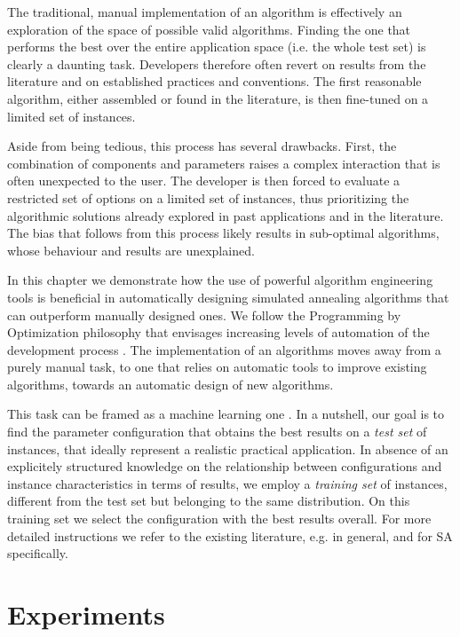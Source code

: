 The traditional, manual implementation of an algorithm is effectively
an exploration of the space of possible valid algorithms. Finding the one
that performs the best over the entire application space (i.e. the whole test set)
is clearly a daunting task.
Developers therefore often revert on results from the
literature and on established practices and conventions. The first 
reasonable algorithm, either assembled or found in the literature,
is then fine-tuned on a limited set of instances.

Aside from being tedious, this process has several drawbacks. 
First, the combination of components and parameters raises a
complex interaction that is often unexpected
to the user. The developer is then forced to evaluate a restricted set of
options on a limited set of instances, thus prioritizing the
algorithmic solutions already explored in past applications and
in the literature. The bias that follows from this process
likely results in sub-optimal algorithms, whose behaviour and
results are unexplained.

In this chapter we demonstrate how the use of powerful algorithm
engineering tools is beneficial in automatically designing simulated annealing
algorithms that can outperform manually designed ones.
We follow the Programming by Optimization philosophy
that envisages increasing levels of automation of the development process
\cite{Hoos:PbO}. 
The implementation of an algorithms moves away
from a purely manual task, to one that relies on automatic tools
to improve existing algorithms, towards an automatic design of new algorithms.

This task can be framed as a machine learning one
\cite{Birattari09tuning}. In a nutshell, our goal is to find 
the parameter configuration that obtains the best results on a \textit{test set} 
of instances, that ideally represent a realistic practical application. 
In absence of an explicitely structured knowledge on the relationship
between configurations and instance characteristics in terms of results, 
we employ a \textit{training set} of instances, different from the test set 
but belonging to the same distribution. On this training set we 
select the configuration with the best results overall.
For more detailed instructions we refer to the existing literature, 
e.g. \cite{Hoos:PbO,MasLopDubStu2014cor,StuLop2019hb,PagStu2019:ejor} in general,
and \cite{FraStu2019:cor} for SA specifically.



\section{Experiments}
\label{sec:exp}


